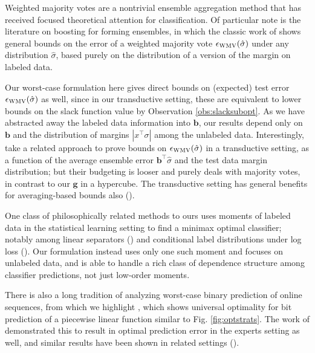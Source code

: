 \documentclass{colt2015} %
\newcommand{\vb}{\mathbf{b}}
\newcommand{\vg}{\mathbf{g}}
\newcommand{\vz}{\mathbf{z}}
\newcommand{\abs}[1]{\left| #1 \right|}
\newcommand{\wmv}{\textsc{WMV}}
\newcommand{\sighat}{\hat{\sigma}}
\newcommand{\lrp}[1]{\left(#1\right)}
\newcommand{\authcmt}[2]{\textcolor{#1}{}}
\newcommand{\akshay}[1]{\authcmt{red}{[AB: #1]}}
\begin{document}

Weighted majority votes are a nontrivial ensemble aggregation method 
that has received focused theoretical attention for classification. 
Of particular note is the literature on boosting for forming ensembles, 
in which the classic work of \cite{SFBL98} shows general bounds 
on the error of a weighted majority vote $\epsilon_{\wmv} (\sighat)$ under any distribution $\sighat$,
based purely on the distribution of a version of the margin on labeled data. 

Our worst-case formulation here gives direct bounds on (expected) test error $\epsilon_{\wmv} (\sighat)$ as well, 
since in our transductive setting, these are equivalent to lower bounds on the slack function value by Observation \ref{obs:slacksubopt}. 
As we have abstracted away the labeled data information into $\vb$, our results depend only on $\vb$ and 
the distribution of margins $\abs{x^\top \sigma}$ among the unlabeled data. 
Interestingly, \cite{AUL09} take a related approach to prove bounds on $\epsilon_{\wmv} (\sighat)$  
in a transductive setting, as a function of the average ensemble error $\vb^\top \sighat$ and the test data margin distribution; 
but their budgeting is looser and purely deals with majority votes, 
in contrast to our $\vg$ in a hypercube. 
The transductive setting has general benefits for averaging-based bounds also (\cite{BL03}).

One class of philosophically related methods to ours uses moments of labeled data 
in the statistical learning setting to find a minimax optimal classifier; 
notably among linear separators (\cite{LGBJ01}) and conditional label distributions under log loss (\cite{LZ14}). 
Our formulation instead uses only one such moment and focuses on unlabeled data, and is able to handle 
a rich class of dependence structure among classifier predictions, not just low-order moments. 

There is also a long tradition of analyzing worst-case binary prediction of online sequences, 
from which we highlight \cite{FMG92}, 
which shows universal optimality for bit prediction of a piecewise linear function similar to Fig. \ref{fig:optstrats}. 
The work of \cite{CBFHHSW93} demonstrated this to result in optimal prediction error 
in the experts setting as well, and similar results have been shown in related settings (\cite{V90, AP13}). 
\end{document}
